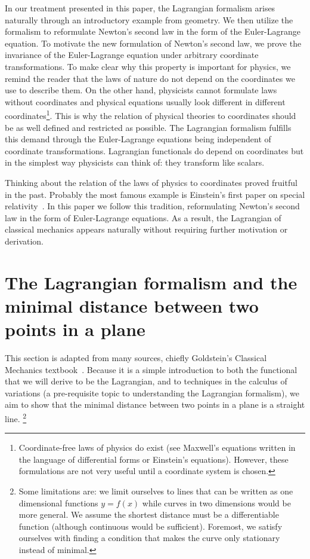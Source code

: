 \documentclass[prb,preprint]{revtex4-1}
\begin{document}
In our treatment presented in this paper, the Lagrangian formalism arises naturally through an introductory example from geometry. We then utilize the formalism to reformulate Newton's second law in the form of the Euler-Lagrange equation. To motivate the new formulation of Newton's second law, we prove the invariance of the Euler-Lagrange equation under arbitrary coordinate transformations. To make clear why this property is important for physics, we remind the reader that the laws of nature do not depend on the coordinates we use to describe them. On the other hand, physicists cannot formulate laws without coordinates and physical equations usually look different in different coordinates\footnote{Coordinate-free laws of physics do exist (see Maxwell's equations written in the language of differential forms or Einstein's equations). However, these formulations are not very useful until a coordinate system is chosen.}. This is why the relation of physical theories to coordinates should be as well defined and restricted as possible. The Lagrangian formalism fulfills this demand through the Euler-Lagrange equations being independent of coordinate transformations. Lagrangian functionals do depend on coordinates but in the simplest way physicists can think of: they transform like scalars.

Thinking about the relation of the laws of physics to coordinates proved fruitful in the past.
Probably the most famous example is Einstein's first paper on special relativity~\cite{EinsteinSpecialRelativity}.
In this paper we follow this tradition, reformulating Newton's second law in the form of Euler-Lagrange equations. As a result, the Lagrangian of classical mechanics appears naturally without requiring further motivation or derivation. 


\section{The Lagrangian formalism and the minimal distance between two points in a plane}\label{distance}

This section is adapted from many sources, chiefly Goldstein's Classical Mechanics textbook~\cite{goldstein2002classical}. Because it is a simple introduction to both the functional that we will derive to be the Lagrangian, and to techniques in the calculus of variations (a pre-requisite topic to understanding the Lagrangian formalism), we aim to show that the minimal distance between two points in a plane is a straight line. 
\footnote{Some limitations are: we limit ourselves to lines that can be written as one dimensional functions $y=f(x)$ while curves in two dimensions would be more general. We assume the shortest distance must be a differentiable function (although continuous would be sufficient). Foremost, we satisfy ourselves with finding a condition that makes the curve only stationary instead of minimal.}
\end{document}
